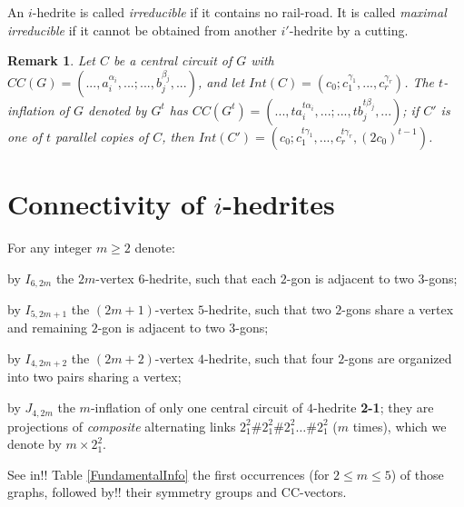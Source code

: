 \documentclass[12pt]{article}
\newtheorem{remark}{Remark}
\begin{document}

An $i$-hedrite is called {\em irreducible} if it contains no 
rail-road. It is called {\em maximal irreducible} if it cannot be
obtained from another $i'$-hedrite by a cutting.


\begin{remark}

Let $C$ be a central circuit of $G$ with 
$CC(G)=(...,a_i^{\alpha_i},...;...,b_j^{\beta_j},...)$, and let 
$Int(C)=(c_0;c_1^{\gamma_1},...,c_r^{\gamma_r})$. The $t$-inflation of $G$
denoted by $G^t$ has 
$CC(G^t)=(...,ta_i^{t\alpha_i},...;...,tb_j^{t\beta_j},...)$; if $C'$
is one of $t$ parallel copies of $C$, then 
$Int(C')=(c_0;c_1^{t\gamma_1},...,c_r^{t\gamma_r}, (2c_0)^{t-1})$.
\end{remark}


\section{Connectivity of $i$-hedrites}
For any integer $m\geq 2$ denote:

by $I_{6,2m}$ the $2m$-vertex $6$-hedrite, such that each $2$-gon is adjacent to two $3$-gons;

by $I_{5,2m+1}$ the $(2m+1)$-vertex $5$-hedrite, such that 
two $2$-gons share a vertex and remaining $2$-gon is adjacent
to two $3$-gons;

by $I_{4,2m+2}$ the $(2m+2)$-vertex $4$-hedrite, such that 
four $2$-gons are organized into two pairs sharing a vertex; 

by $J_{4,2m}$ the $m$-inflation of only one central circuit of
$4$-hedrite {\bf 2-1}; they are projections of {\em composite}
alternating links $2^2_1\#2^2_1\#2^2_1\dots\#2^2_1$ ($m$ times),
which we denote by $m\times 2^2_1$.

See in!! Table \ref{FundamentalInfo} the first occurrences 
(for $2\leq m\leq 5$) of those graphs, followed by!! their symmetry 
groups and CC-vectors.
\end{document}
